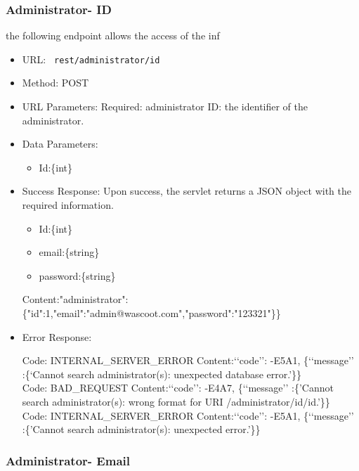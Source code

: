 \subsubsection*{ Administrator- ID }
the following endpoint allows the access of the inf 
\begin{itemize}
    \item URL: \texttt{ rest/administrator/id}
    \item Method: POST
    \item URL Parameters: Required: administrator ID: the identifier of the administrator.
    \item Data Parameters: 
    \begin{itemize}
       \item  Id:\{int\}
    \end{itemize}
    \item Success Response: Upon success, the servlet returns a JSON object with the required information.
        \begin{itemize}
       \item  Id:\{int\}
       \item  email:\{string\}
       \item  password:\{string\}
    \end{itemize}

    Content:"administrator":\{"id":1,"email":"admin@wascoot.com","password":"123321"\}\}
    \item Error Response: 
     
Code: INTERNAL\_SERVER\_ERROR \newline
Content:‘‘code’’: -E5A1, \{‘‘message’’ :\{‘Cannot search administrator(s): unexpected database error.'\}\}
\\
Code: BAD\_REQUEST\newline
Content:‘‘code’’: -E4A7, \{‘‘message’’ :\{'Cannot search administrator(s): wrong format for URI /administrator/id/{id}.'\}\}
\\
Code: INTERNAL\_SERVER\_ERROR\newline
Content:‘‘code’’: -E5A1, \{‘‘message’’ :\{'Cannot search administrator(s): unexpected error.'\}\}
    
\end{itemize}

\subsubsection*{ Administrator- Email }

